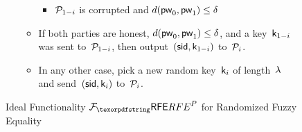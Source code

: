 \begin{figure}[tb]
\begin{fboxenv}
\begin{minipage}{0.95\textwidth}
\begin{itemize}
\begin{itemize}
\begin{itemize}
           \item $\mathcal{P}_{1-i}$ is corrupted and $d(\mathsf{pw}_{0},\mathsf{pw}_{1}) \leq \delta$
          \end{itemize}
        \item If both parties are honest, $d(\mathsf{pw}_{0},\mathsf{pw}_{1}) \leq \delta$, and a key~$\mathsf{k}_{1-i}$ was sent to~$\mathcal{P}_{1-i}$,
          then output~$(\mathsf{sid},\mathsf{k}_{1-i})$ to~$\mathcal{P}_i$.
        \item In any other case, pick a new random key~$\mathsf{k}_{i}$ of length~$\lambda$ and send~$(\mathsf{sid},\mathsf{k}_{i})$ to~$\mathcal{P}_{i}$.
        \end{itemize}
      \end{itemize}
    \end{minipage}
  \end{fboxenv}
  \caption{Ideal Functionality $\Frfe^{P}$ for Randomized Fuzzy Equality}
  \label{fig:func-RFE}
\end{figure}
